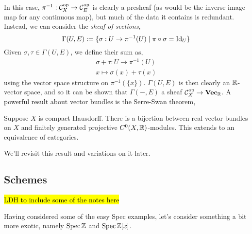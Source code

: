 \documentclass[000-main.tex]{subfiles}
\begin{document}
In this case, $\pi^{-1}: \mathcal{C}_X^{\text{op}}\to \mathcal{C}_E^{\text{op}}$ is clearly a presheaf (as would be the inverse image map for any continuous map), but much of the data it contains is redundant.
Instead, we can consider the \emph{sheaf of sections},
\begin{displaymath}
  \Gamma(U, E) := \{\sigma: U\to \pi^{-1}(U) \mid \pi\circ\sigma = \operatorname{Id}_U\}
\end{displaymath}
Given $\sigma, \tau\in\Gamma(U,E)$, we define their sum as,
\begin{displaymath}
  \begin{gathered}
    \sigma + \tau: U\to \pi^{-1}(U)\\
    x \mapsto \sigma(x) + \tau(x)
  \end{gathered}
\end{displaymath}
using the vector space structure on $\pi^{-1}(\{x\})$.
$\Gamma(U, E)$ is then clearly an $\mathbb{R}$-vector space, and so it can be shown that $\Gamma(-, E)$ a sheaf $\mathcal{C}_X^{\text{op}}\to \mathbf{Vec}_{\mathbb{R}}$.
A powerful result about vector bundles is the Serre-Swan theorem,
\begin{theorem}
  Suppose $X$ is compact Hausdorff.
  There is a bijection between real vector bundles on $X$ and finitely generated projective $C^0(X, \mathbb{R})$-modules.
  This extends to an equivalence of categories.
\end{theorem}
We'll revisit this result and variations on it later.


\subsection{Schemes}%
\label{sec:schemes}

\hl{LDH to include some of the notes here}

\begin{example}
	Having considered some of the easy Spec examples, let's consider something a bit more exotic, namely $\operatorname{Spec} \mathbb{Z}$ and $\operatorname{Spec} \mathbb{Z}[x]$. 
\end{example}
\end{document}
